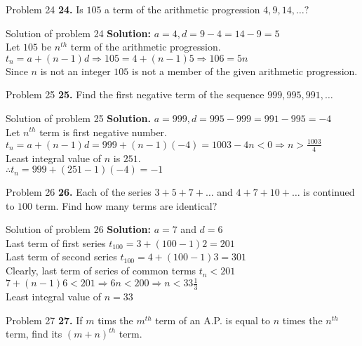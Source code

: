 \documentclass[aspectratio=1610,8pt]{beamer}
\begin{document}
\begin{frame}{Problem 24}
  \textbf{24.} Is $105$ a term of the arithmetic progression $4, 9, 14, \ldots ?$
\end{frame}
\begin{frame}{Solution of problem 24}
  \textbf{Solution:} $a = 4, d = 9 - 4 = 14 - 9 = 5$\\
  Let $105$ be $n^{th}$ term of the arithmetic progression.\\
  $t_n = a + (n - 1)d \Rightarrow 105 = 4 + (n - 1)5 \Rightarrow 106 = 5n$\\
  Since $n$ is not an integer $105$ is not a member of the given arithmetic progression.
\end{frame}
\begin{frame}{Problem 25}
  \textbf{25.} Find the first negative term of the sequence $999, 995, 991, \ldots$
\end{frame}
\begin{frame}{Solution of problem 25}
  \textbf{Solution.} $a = 999, d = 995 - 999 = 991 - 995 = -4$\\
  Let $n^{th}$ term is first negative number.\\
  $t_n = a + (n - 1)d = 999 + (n - 1)(-4) = 1003 - 4n < 0 \Rightarrow n >
  \frac{1003}{4}$\\
  Least integral value of $n$ is $251.$\\
  $\therefore t_n = 999 + (251 - 1)(-4) = -1$
\end{frame}
\begin{frame}{Problem 26}
  \textbf{26.} Each of the series $3 + 5 + 7 + \ldots$ and $4 + 7 + 10 +
  \ldots$ is continued to $100$ term. Find how many terms are identical?
\end{frame}
\begin{frame}{Solution of problem 26}
  \textbf{Solution:} $a = 7$ and $d = 6$\\
  Last term of first series $t_{100} = 3 + (100 - 1)2 = 201$\\
  Last term of second series $t_{100} = 4 + (100 - 1)3 = 301$\\
  Clearly, last term of series of common terms $t_n < 201$\\
  $7 + (n - 1)6 < 201 \Rightarrow 6n < 200 \Rightarrow n < 33\frac{1}{3}$\\
  Least integral value of $n = 33$
\end{frame}
\begin{frame}{Problem 27}
  \textbf{27.} If $m$ tims the $m^{th}$ term of an A.P. is equal to $n$ times
  the $n^{th}$ term, find its $(m + n)^{th}$ term.
\end{frame}
\end{document}
